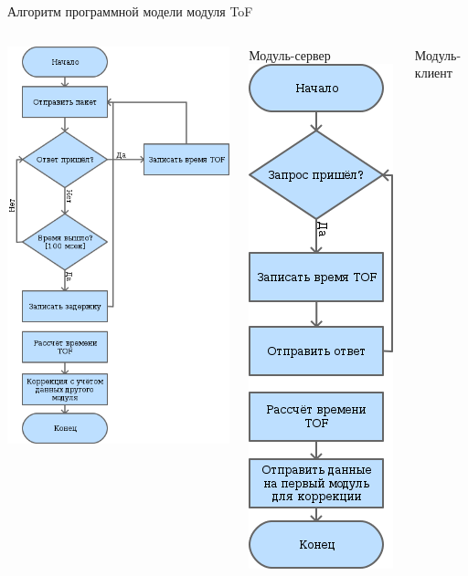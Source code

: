 \begin{frame}{Алгоритм программной модели модуля ToF}
    \begin{columns}
        \centering
        \includegraphics[width=.6\linewidth]{../Figures/codeblock.png}

        Модуль-сервер
        \centering
        \includegraphics[width=.3\linewidth]{../Figures/codeblock2.png}

        Модуль-клиент
    \end{columns}
\end{frame}

